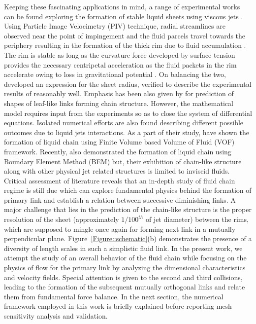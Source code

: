 \documentclass{jfm}
\begin{document}
Keeping these fascinating applications in mind, a range of experimental works can be found exploring the formation of stable liquid sheets using viscous jets \citep{choo2001parametric,choo2002velocity,bush2004collision}. Using Particle Image Velocimetry (PIV) technique, radial streamlines are observed near the point of impingement and the fluid parcels travel towards the periphery resulting in the formation of the thick rim due to fluid accumulation \citep{choo2002velocity,bush2004collision}. The rim is stable as long as the curvature force developed by surface tension provides the necessary centripetal acceleration as the fluid packets in the rim accelerate owing to loss in gravitational potential \citep{bremond2006atomization}. On balancing the two, \cite{taylor1960formation} developed an expression for the sheet radius, verified to describe the experimental results of \cite{bush2004collision} reasonably well. Emphasis has been also given by \cite{bush2004collision} for prediction of shapes of leaf-like links forming chain structure. However, the mathematical model requires input from the experiments so as to close the system of differential equations. Isolated numerical efforts are also found describing different possible outcomes due to liquid jets interactions. As a part of their study, \cite{chen2013high} have shown the formation of liquid chain using Finite Volume based Volume of Fluid (VOF) framework. Recently, \cite{da2016surface} also demonstrated the formation of liquid chain using Boundary Element Method (BEM) but, their exhibition of chain-like structure along with other physical jet related structures is limited to inviscid fluids.\\
Critical assessment of literature reveals that an in-depth study of fluid chain regime is still due which can explore fundamental physics behind the formation of primary link and establish a relation between successive diminishing links. A major challenge that lies in the prediction of the chain-like structure is the proper resolution of the sheet (approximately $1/100^{th}$ of jet diameter) between the rims, which are supposed to mingle once again for forming next link in a mutually perpendicular plane. Figure~\ref{Figure::schematic}(b) demonstrates the presence of a diversity of length scales in such a simplistic fluid link. In the present work, we attempt the study of an overall behavior of the fluid chain while focusing on the physics of flow for the primary link by analyzing the dimensional characteristics and velocity fields. Special attention is given to the second and third collisions, leading to the formation of the subsequent mutually orthogonal links and relate them from fundamental force balance. In the next section, the numerical framework employed in this work is briefly explained before reporting mesh sensitivity analysis and validation.
\end{document}
